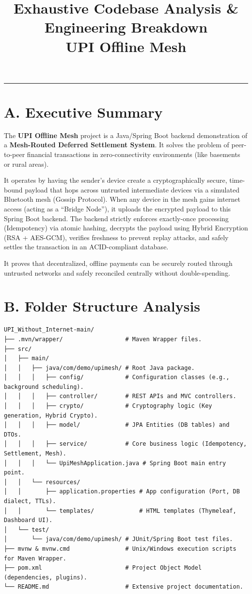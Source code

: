\documentclass[11pt, a4paper]{article}
\title{\textbf{Exhaustive Codebase Analysis \& Engineering Breakdown}\\UPI Offline Mesh}
\author{}
\date{}
\begin{document}
\maketitle

\hrule
\vspace{1em}

\section*{A. Executive Summary}
The \textbf{UPI Offline Mesh} project is a Java/Spring Boot backend demonstration of a \textbf{Mesh-Routed Deferred Settlement System}. It solves the problem of peer-to-peer financial transactions in zero-connectivity environments (like basements or rural areas). 

It operates by having the sender's device create a cryptographically secure, time-bound payload that hops across untrusted intermediate devices via a simulated Bluetooth mesh (Gossip Protocol). When any device in the mesh gains internet access (acting as a ``Bridge Node''), it uploads the encrypted payload to this Spring Boot backend. The backend strictly enforces exactly-once processing (Idempotency) via atomic hashing, decrypts the payload using Hybrid Encryption (RSA + AES-GCM), verifies freshness to prevent replay attacks, and safely settles the transaction in an ACID-compliant database. 

It proves that decentralized, offline payments can be securely routed through untrusted networks and safely reconciled centrally without double-spending.

\section*{B. Folder Structure Analysis}

\begin{verbatim}
UPI_Without_Internet-main/
├── .mvn/wrapper/                  # Maven Wrapper files.
├── src/
│   ├── main/
│   │   ├── java/com/demo/upimesh/ # Root Java package.
│   │   │   ├── config/            # Configuration classes (e.g., background scheduling).
│   │   │   ├── controller/        # REST APIs and MVC controllers.
│   │   │   ├── crypto/            # Cryptography logic (Key generation, Hybrid Crypto).
│   │   │   ├── model/             # JPA Entities (DB tables) and DTOs.
│   │   │   ├── service/           # Core business logic (Idempotency, Settlement, Mesh).
│   │   │   └── UpiMeshApplication.java # Spring Boot main entry point.
│   │   └── resources/
│   │       ├── application.properties # App configuration (Port, DB dialect, TTLs).
│   │       └── templates/             # HTML templates (Thymeleaf, Dashboard UI).
│   └── test/
│       └── java/com/demo/upimesh/ # JUnit/Spring Boot test files.
├── mvnw & mvnw.cmd                # Unix/Windows execution scripts for Maven Wrapper.
├── pom.xml                        # Project Object Model (dependencies, plugins).
└── README.md                      # Extensive project documentation.
\end{verbatim}
\end{document}
